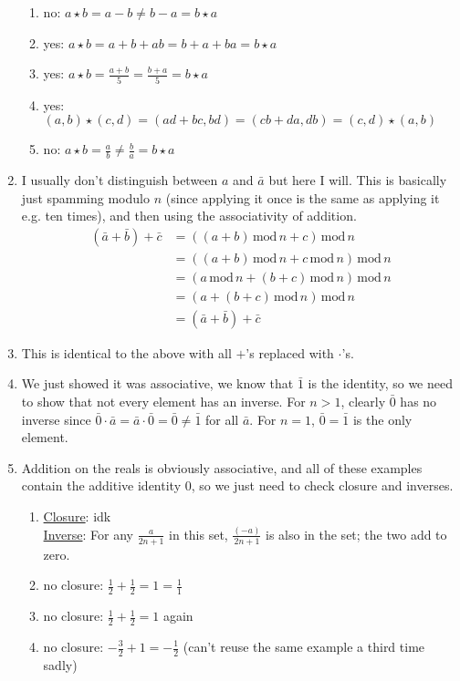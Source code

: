 \documentclass[]{article}
\newcommand{\md}{\,\text{mod}\,}
\begin{document}
\begin{enumerate}
\begin{enumerate}
\item no: $a\star b = a - b \neq b - a = b\star a$
\item yes: $a\star b = a + b + ab = b + a + ba = b\star a$
\item yes: $a\star b = \frac{a+b}{5} = \frac{b+a}{5} = b\star a$
\item yes: $(a,b)\star (c,d) = (ad+bc,bd) = (cb+da,db) = (c,d)\star (a,b)$
\item no: $a\star b = \frac{a}{b} \neq \frac{b}{a} = b\star a$
\end{enumerate}
\item I usually don't distinguish between $a$ and $\bar{a}$ but here I will. This is basically just spamming modulo $n$ (since applying it once is the same as applying it e.g. ten times), and then using the associativity of addition.
\begin{align}
(\bar{a} + \bar{b}) + \bar{c} &= \left( (a+b)\md n + c \right) \md n \\
&= \left( (a+b)\md n + c\md n \right) \md n \\
&= \left( a\md n + (b+c)\md n \right) \md n \\
&= \left( a + (b+c)\md n \right) \md n \\
&= (\bar{a} + \bar{b}) + \bar{c}
\end{align}
\item This is identical to the above with all $+$'s replaced with $\cdot$'s.
\item We just showed it was associative, we know that $\bar{1}$ is the identity, so we need to show that not every element has an inverse. For $n>1$, clearly $\bar{0}$ has no inverse since $\bar{0}\cdot\bar{a} = \bar{a}\cdot\bar{0} = \bar{0} \neq \bar{1}$ for all $\bar{a}$. For $n=1$, $\bar{0} = \bar{1}$ is the only element.
\item Addition on the reals is obviously associative, and all of these examples contain the additive identity $0$, so we just need to check closure and inverses.\begin{enumerate}
\item \underline{Closure}: {\color{red} idk} \\
\underline{Inverse}: For any $\frac{a}{2n+1}$ in this set, $\frac{(-a)}{2n+1}$ is also in the set; the two add to zero.
\item no closure: $\frac{1}{2} + \frac{1}{2} = 1 = \frac{1}{1}$ 
\item no closure: $\frac{1}{2} + \frac{1}{2} = 1$ again
\item no closure: $-\frac{3}{2} + 1 = -\frac{1}{2}$ (can't reuse the same example a third time sadly)

\end{enumerate}
\end{enumerate}
\end{document}
